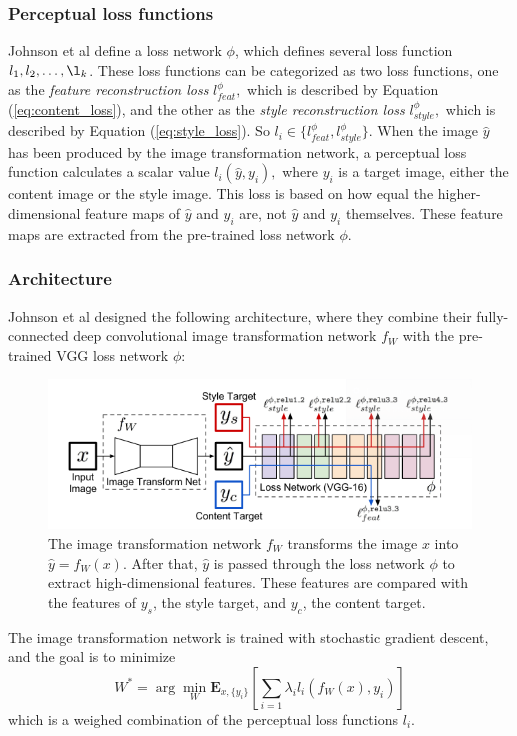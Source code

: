 \subsubsection{Perceptual loss functions}
\label{sec:loss}
Johnson et al define a loss network $\phi$, which defines several loss function $l_1,l_2,\dots,\l_k$. These loss functions can be categorized as two loss functions, one as the \textit{feature reconstruction loss} $l_{feat}^\phi,$ which is described by Equation (\ref{eq:content_loss}), and the other as the \textit{style reconstruction loss} $l_{style}^\phi,$ which is described by Equation (\ref{eq:style_loss}). So $l_i\in\{l_{feat}^\phi,l_{style}^\phi\}.$ When the image $\hat{y}$ has been produced by the image transformation network, a perceptual loss function calculates a scalar value $l_i(\hat{y}, y_i),$ where $y_i$ is a target image, either the content image or the style image. This loss is based on how equal the higher-dimensional feature maps of $\hat{y}$ and $y_i$ are, not $\hat{y}$ and $y_i$ themselves. These feature maps are extracted from the pre-trained loss network $\phi.$
\subsubsection{Architecture}
Johnson et al designed the following architecture, where they combine their fully-connected deep convolutional image transformation network $f_W$ with the pre-trained VGG loss network $\phi:$\newline
\begin{figure}[!ht]
\begin{center}
\includegraphics[scale=0.50]{report/Background/images/architecture.png}
\caption{The image transformation network $f_W$ transforms the image $x$ into $\hat{y}=f_W(x).$ After that, $\hat{y}$ is passed through the loss network $\phi$ to extract high-dimensional features. These features are compared with the features of $y_s$, the style target, and $y_c$, the content target.}
\label{fig:architecture}
\end{center}
\end{figure}\newline\newline
The image transformation network is trained with stochastic gradient descent, and the goal is to minimize
\begin{equation}
    W^*=\arg\min_W{\boldsymbol{E}_{x,\{y_i\}}\left[\sum_{i=1}{\lambda_il_i(f_W(x),y_i)}\right]}
\end{equation}
which is a weighed combination of the perceptual loss functions $l_i$.

